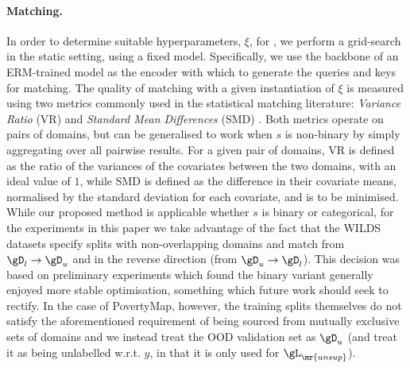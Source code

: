 \paragraph{Matching.}\label{matching_imp} In order to determine suitable hyperparameters, $\xi$, for
\CNN, we perform a grid-search in the static setting, using a fixed model. Specifically, we use the
backbone of an ERM-trained model as the encoder with which to generate the queries and keys for
matching.
%
The quality of matching with a given instantiation of $\xi$ is measured using two metrics commonly
used in the statistical matching literature: \emph{Variance Ratio} (VR) and \emph{Standard Mean
Differences} (SMD) \citep{rubin2001using}. 
%
Both metrics operate on pairs of domains, but can be generalised to work when $s$ is non-binary by
simply aggregating over all pairwise results.
%
For a given pair of domains, VR is defined as the ratio of the variances of the covariates between
the two domains, with an ideal value of $1$, while SMD is defined as the difference in their
covariate means, normalised by the standard deviation for each covariate, and is to be minimised.
%
While our proposed method is applicable whether $s$ is binary or categorical, for the experiments
in this paper we take advantage of the fact that the WILDS datasets specify splits with
non-overlapping domains and match from \( \gD_l \to \gD_u \) and in the reverse direction (from
\( \gD_u \to \gD_l \)). This decision was based on preliminary experiments which found the binary
variant generally enjoyed more stable optimisation, something which future work should seek to
rectify.
%
In the case of PovertyMap, however, the training splits themselves do not satisfy the
aforementioned requirement of being sourced from mutually exclusive sets of domains and we instead
treat the OOD validation set as \( \gD_u \) (and treat it as being unlabelled w.r.t. $y$, in that it is
only used for \( \gL_\mr{unsup} \)).

